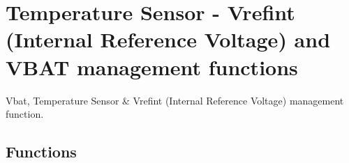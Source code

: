 \hypertarget{group___a_d_c___group3}{\section{Temperature Sensor -\/ Vrefint (Internal Reference Voltage) and V\-B\-A\-T management functions}
\label{group___a_d_c___group3}
}


Vbat, Temperature Sensor \& Vrefint (Internal Reference Voltage) management function.  


\subsection*{Functions}
